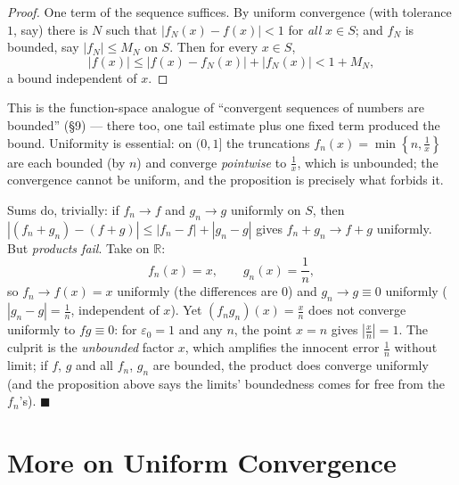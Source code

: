 \documentclass[11pt]{report}
\begin{document}
\begin{proof}
One term of the sequence suffices. By uniform convergence (with tolerance $1$, say) there is $N$ such that $|f_N(x) - f(x)| < 1$ for \emph{all} $x \in S$; and $f_N$ is bounded, say $|f_N| \leq M_N$ on $S$. Then for every $x \in S$,
\[
|f(x)| \leq |f(x) - f_N(x)| + |f_N(x)| < 1 + M_N,
\]
a bound independent of $x$.
\end{proof}

\begin{rembox}
This is the function-space analogue of ``convergent sequences of numbers are bounded'' (\S 9) --- there too, one tail estimate plus one fixed term produced the bound. Uniformity is essential: on $(0,1]$ the truncations $f_n(x) = \min\left\{ n, \tfrac1x \right\}$ are each bounded (by $n$) and converge \emph{pointwise} to $\tfrac1x$, which is unbounded; the convergence cannot be uniform, and the proposition is precisely what forbids it.
\end{rembox}

\begin{exbox}
Sums do, trivially: if $f_n \to f$ and $g_n \to g$ uniformly on $S$, then $|(f_n + g_n) - (f+g)| \leq |f_n - f| + |g_n - g|$ gives $f_n + g_n \to f + g$ uniformly. But \emph{products fail}. Take on $\mathbb{R}$:
\[
f_n(x) = x, \qquad g_n(x) = \frac1n,
\]
so $f_n \to f(x) = x$ uniformly (the differences are $0$) and $g_n \to g \equiv 0$ uniformly ($|g_n - g| = \tfrac1n$, independent of $x$). Yet $(f_n g_n)(x) = \tfrac{x}{n}$ does not converge uniformly to $fg \equiv 0$: for $\varepsilon_0 = 1$ and any $n$, the point $x = n$ gives $\left|\tfrac{x}{n}\right| = 1$. The culprit is the \emph{unbounded} factor $x$, which amplifies the innocent error $\tfrac1n$ without limit; if $f$, $g$ and all $f_n$, $g_n$ are bounded, the product does converge uniformly (and the proposition above says the limits' boundedness comes for free from the $f_n$'s). \hfill $\blacksquare$
\end{exbox}


\section{More on Uniform Convergence}
\end{document}
